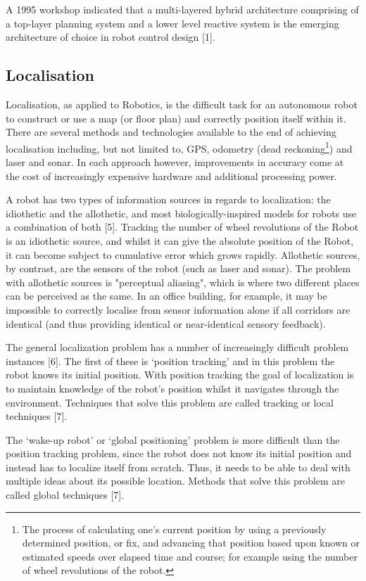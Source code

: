 \documentclass{article}
\begin{document}
\begin{multicols}{2}
A 1995 workshop indicated that a multi-layered hybrid architecture comprising of a top-layer planning system and a lower level reactive system is the emerging architecture of choice in robot control design [1].

	\subsection{Localisation}
	Localisation, as applied to Robotics, is the difficult task for an autonomous robot to construct or use a map (or floor plan) and correctly position itself within it. There are several methods and technologies available to the end of achieving localisation including, but not limited to, GPS, odometry (dead reckoning\footnote{The process of calculating one's current position by using a previously determined position, or fix, and advancing that position based upon known or estimated speeds over elapsed time and course; for example using the number of wheel revolutions of the robot.}) and laser and sonar. In each approach however, improvements in accuracy come at the cost of increasingly expensive hardware and  additional processing power. 

A robot has two types of information sources in regards to localization: the idiothetic and the allothetic, and most biologically-inspired models for robots use a combination of both [5]. Tracking the number of wheel revolutions of the Robot is an idiothetic source, and whilst it can give the absolute position of the Robot, it can become subject to cumulative error which grows rapidly. Allothetic sources, by contrast, are the sensors of the robot (such as laser and sonar). The problem with allothetic sources  is "perceptual aliasing", which is where two different places can be perceived as the same. In an office building, for example, it may be impossible to correctly localise from sensor information alone if all corridors are identical (and thus providing identical or near-identical sensory feedback).

The general localization problem has a number of increasingly difficult problem instances [6]. The first of these is ‘position tracking’ and in this problem the robot knows its initial position. With position tracking the goal of localization is to maintain knowledge of the robot’s position whilst it navigates through the environment.  Techniques that solve this problem are called tracking or local techniques [7]. 

The ‘wake-up robot’ or ‘global positioning’ problem is more difficult than the position tracking problem, since the robot does not know its initial position and instead has to localize itself from scratch. Thus, it needs to be able to deal with multiple ideas about its possible location. Methods that solve this problem are called global techniques [7]. 


\end{multicols}
\end{document}
